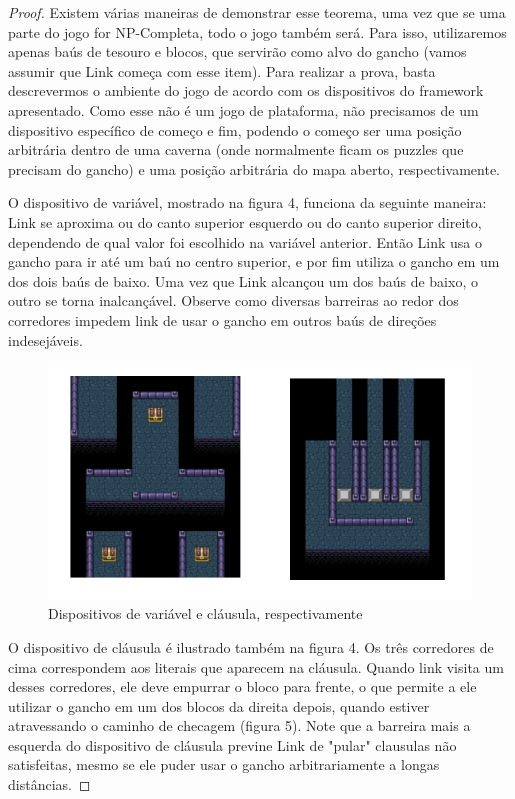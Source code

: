 \begin{proof}
    Existem várias maneiras de demonstrar esse teorema, uma vez que se uma parte do jogo
    for NP-Completa, todo o jogo também será. Para isso, utilizaremos apenas baús de tesouro
    e blocos, que servirão como alvo do gancho (vamos assumir que Link começa com esse item).
    Para realizar a prova, basta descrevermos o ambiente do jogo de acordo com os dispositivos
    do framework apresentado. Como esse não é um jogo de plataforma, não precisamos de um dispositivo
    específico de começo e fim, podendo o começo ser uma posição arbitrária dentro de uma caverna
    (onde normalmente ficam os puzzles que precisam do gancho) e uma posição arbitrária do mapa aberto,
    respectivamente.
    
    O dispositivo de variável, mostrado na figura 4, funciona da seguinte maneira: Link se aproxima ou
    do canto superior esquerdo ou do canto superior direito, dependendo de qual valor foi escolhido na
    variável anterior. Então Link usa o gancho para ir até um baú no centro superior, e por fim utiliza o
    gancho em um dos dois baús de baixo. Uma vez que Link alcançou um dos baús de baixo, o outro se torna
    inalcançável. Observe como diversas barreiras ao redor dos corredores impedem link de usar o gancho em outros
    baús de direções indesejáveis.
    
    \begin{figure}[!htb]
        \centering
        \includegraphics[scale=0.8]{proof1.png}
        \caption{Dispositivos de variável e cláusula, respectivamente}
    \end{figure}
    
    O dispositivo de cláusula é ilustrado também na figura 4. Os três corredores de cima correspondem aos literais que aparecem
    na cláusula. Quando link visita um desses corredores, ele deve empurrar o bloco para frente, o que permite a ele 
    utilizar o gancho em um dos blocos da direita depois, quando estiver atravessando o caminho de checagem (figura 5).
    Note que a barreira mais a esquerda do dispositivo de cláusula previne Link de "pular" clausulas não satisfeitas, mesmo
    se ele puder usar o gancho arbitrariamente a longas distâncias.
    

\end{proof}
